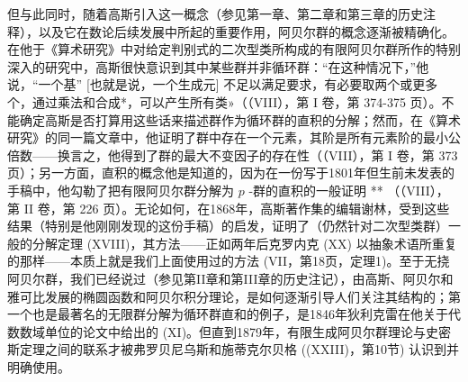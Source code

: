 但与此同时，随着高斯引入这一概念（参见第一章、第二章和第三章的历史注释），以及它在数论后续发展中所起的重要作用，阿贝尔群的概念逐渐被精确化。在他于《算术研究》中对给定判别式的二次型类所构成的有限阿贝尔群所作的特别深入的研究中，高斯很快意识到其中某些群并非循环群：“在这种情况下，”他说，“一个基” {[}也就是说，一个生成元{]} 不足以满足要求，有必要取两个或更多个，通过乘法和合成*，可以产生所有类»（（VIII），第 I 卷，第 374-375 页）。不能确定高斯是否打算用这些话来描述群作为循环群的直积的分解；然而，在《算术研究》的同一篇文章中，他证明了群中存在一个元素，其阶是所有元素阶的最小公倍数——换言之，他得到了群的最大不变因子的存在性（（VIII），第 I 卷，第 373 页）；另一方面，直积的概念他是知道的，因为在一份写于1801年但生前未发表的手稿中，他勾勒了把有限阿贝尔群分解为 \(p\) -群的直积的一般证明 ** （（VIII），第 II 卷，第 226 页）。无论如何，在1868年，高斯著作集的编辑谢林，受到这些结果（特别是他刚刚发现的这份手稿）的启发，证明了（仍然针对二次型类群）一般的分解定理 (XVIII)，其方法——正如两年后克罗内克 (XX) 以抽象术语所重复的那样——本质上就是我们上面使用过的方法 (VII，第18页，定理1)。至于无挠阿贝尔群，我们已经说过（参见第II章和第III章的历史注记），由高斯、阿贝尔和雅可比发展的椭圆函数和阿贝尔积分理论，是如何逐渐引导人们关注其结构的；第一个也是最著名的无限群分解为循环群直和的例子，是1846年狄利克雷在他关于代数数域单位的论文中给出的 (XI)。但直到1879年，有限生成阿贝尔群理论与史密斯定理之间的联系才被弗罗贝尼乌斯和施蒂克尔贝格 ((XXIII)，第10节) 认识到并明确使用。

